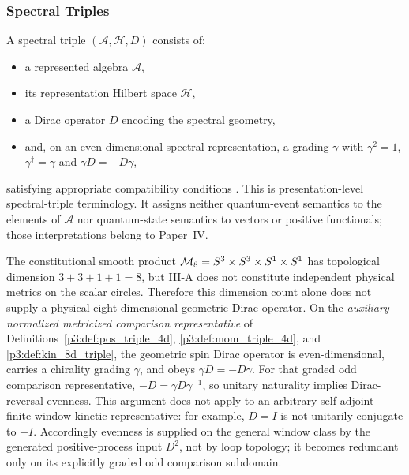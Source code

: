 \documentclass[12pt,a4paper]{article}
\begin{document}
\subsubsection{Spectral Triples}

\begin{definition}
A spectral triple $(\mathcal{A}, \mathcal{H}, D)$ consists of:
\begin{itemize}
    \item a represented algebra $\mathcal{A}$,
    \item its representation Hilbert space $\mathcal{H}$,
    \item a Dirac operator $D$ encoding the spectral geometry,
    \item and, on an even-dimensional spectral representation, a grading \(\gamma\) with
      \(\gamma^2=1\), \(\gamma^\dagger=\gamma\) and \(\gamma D=-D\gamma\),
\end{itemize}
satisfying appropriate compatibility conditions \cite{Connes1996,GraciaBondia2001}.
This is presentation-level spectral-triple terminology.  It assigns neither
quantum-event semantics to the elements of \(\mathcal A\) nor quantum-state
semantics to vectors or positive functionals; those interpretations belong to
Paper~IV.
\end{definition}

\begin{remark}
\label{p3:rem:grading-role}
The constitutional smooth product
\(\mathcal M_8=S^3\times S^3\times S^1\times S^1\) has topological dimension
\(3+3+1+1=8\), but III-A does not constitute independent physical metrics on
the scalar circles.  Therefore this dimension count alone does not supply a
physical eight-dimensional geometric Dirac operator.  On the \emph{auxiliary
normalized metricized comparison representative} of
Definitions~\ref{p3:def:pos_triple_4d}, \ref{p3:def:mom_triple_4d}, and
\ref{p3:def:kin_8d_triple}, the geometric spin Dirac operator is even-dimensional,
carries a chirality grading \(\gamma\), and obeys \(\gamma D=-D\gamma\).
For that graded odd comparison representative,
\(-D=\gamma D\gamma^{-1}\), so unitary naturality implies Dirac-reversal
evenness.  This argument does not apply to an arbitrary self-adjoint
finite-window kinetic representative: for example, \(D=I\) is not unitarily
conjugate to \(-I\).  Accordingly evenness is supplied on the general window
class by the generated positive-process input \(D^2\), not by loop topology;
it becomes redundant only
on its explicitly graded odd comparison subdomain.
\end{remark}
\end{document}
